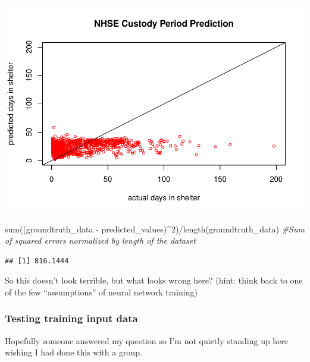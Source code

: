 \documentclass[
]{article}
\newenvironment{Shaded}{\begin{snugshade}}{\end{snugshade}}
\newcommand{\AttributeTok}[1]{\textcolor[rgb]{0.77,0.63,0.00}{#1}}
\newcommand{\CommentTok}[1]{\textcolor[rgb]{0.56,0.35,0.01}{\textit{#1}}}
\newcommand{\DecValTok}[1]{\textcolor[rgb]{0.00,0.00,0.81}{#1}}
\newcommand{\FunctionTok}[1]{\textcolor[rgb]{0.00,0.00,0.00}{#1}}
\newcommand{\NormalTok}[1]{#1}
\newcommand{\SpecialCharTok}[1]{\textcolor[rgb]{0.00,0.00,0.00}{#1}}
\begin{document}
\includegraphics{neuralNet_files/figure-latex/unnamed-chunk-13-1}

\begin{Shaded}
\begin{Highlighting}[]
\FunctionTok{sum}\NormalTok{((groundtruth\_data }\SpecialCharTok{{-}}\NormalTok{ predicted\_values)}\SpecialCharTok{\^{}}\DecValTok{2}\NormalTok{)}\SpecialCharTok{/}\FunctionTok{length}\NormalTok{(groundtruth\_data) }\CommentTok{\#Sum of squared errors normalized by length of the dataset}
\end{Highlighting}
\end{Shaded}

\begin{verbatim}
## [1] 816.1444
\end{verbatim}

So this doesn't look terrible, but what looks wrong here? (hint: think
back to one of the few ``assumptions'' of neural network training)

\hypertarget{testing-training-input-data}{%
\subsubsection{Testing training input
data}\label{testing-training-input-data}}

Hopefully someone answered my question so I'm not quietly standing up
here wishing I had done this with a group.

\begin{Shaded}
\end{Shaded}
\end{document}
